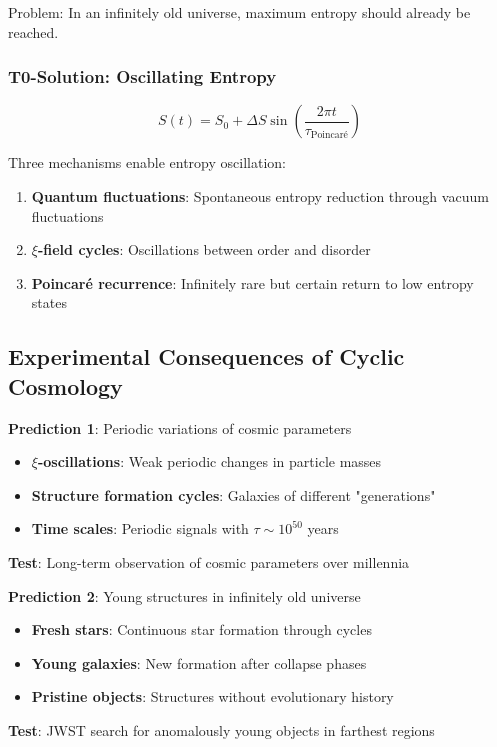 \documentclass[12pt,a4paper]{article}
\theoremstyle{definition}
\begin{document}
	Problem: In an infinitely old universe, maximum entropy should already be reached.
	
	\subsubsection{T0-Solution: Oscillating Entropy}
	\begin{equation}
		S(t) = S_0 + \Delta S \sin\left(\frac{2\pi t}{\tau_{\text{Poincaré}}}\right)
	\end{equation}
	
	\begin{important}
		Three mechanisms enable entropy oscillation:
		\begin{enumerate}
			\item \textbf{Quantum fluctuations}: Spontaneous entropy reduction through vacuum fluctuations
			\item \textbf{$\xi$-field cycles}: Oscillations between order and disorder
			\item \textbf{Poincaré recurrence}: Infinitely rare but certain return to low entropy states
		\end{enumerate}
	\end{important}
	
	\subsection{Experimental Consequences of Cyclic Cosmology}
	
	\begin{experiment}
		\textbf{Prediction 1}: Periodic variations of cosmic parameters
		\begin{itemize}
			\item \textbf{$\xi$-oscillations}: Weak periodic changes in particle masses
			\item \textbf{Structure formation cycles}: Galaxies of different "generations" 
			\item \textbf{Time scales}: Periodic signals with $\tau \sim 10^{50}$ years
		\end{itemize}
		\textbf{Test}: Long-term observation of cosmic parameters over millennia
	\end{experiment}
	
	\begin{experiment}
		\textbf{Prediction 2}: Young structures in infinitely old universe  
		\begin{itemize}
			\item \textbf{Fresh stars}: Continuous star formation through cycles
			\item \textbf{Young galaxies}: New formation after collapse phases
			\item \textbf{Pristine objects}: Structures without evolutionary history
		\end{itemize}
		\textbf{Test}: JWST search for anomalously young objects in farthest regions
	\end{experiment}
	
\end{document}
